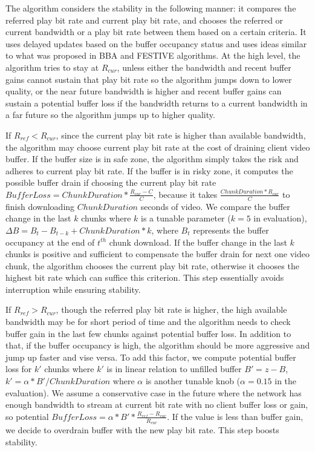 The algorithm considers the stability in the following manner: it
compares the referred play bit rate and current play bit rate, and
chooses the referred or current bandwidth or a play bit rate
between them based on a certain criteria. It uses delayed updates
based on the buffer occupancy status and uses ideas similar to what
was proposed in BBA \cite{BBA} and FESTIVE \cite{Festive} algorithms. 
At the high level, the algorithm tries to stay at $R_{cur}$, 
unless either the bandwidth and recent buffer gains cannot sustain 
that play bit rate so the algorithm jumps down to lower quality, 
or the near future bandwidth is higher and recent buffer gains can sustain a 
potential buffer loss if the bandwidth returns to a current bandwidth in a far future so the algorithm jumps up to higher quality.

If $R_{ref} < R_{cur}$, since the current play bit rate is higher than available bandwidth, the
algorithm may choose current play bit rate at the cost of draining
client video buffer. If the buffer size is in safe zone, the
algorithm simply takes the risk and adheres to current play bit rate. If the
buffer is in risky zone, it computes the possible buffer drain if
choosing the current play bit rate $BufferLoss
=ChunkDuration*\frac{R_{cur}-C}{C}$, because it takes $\frac{ChunkDuration*R_{cur}}{C}$ to finish downloading 
$ChunkDuration$ seconds of video. 
We compare the buffer change in
the last $k$ chunks where $k$ is a tunable parameter ($k=5$ in evaluation), 
$\Delta B = B_{t} -B_{t-k} + ChunkDuration*k$, where $B_{t}$
represents the buffer occupancy at the end of $t^{th}$ chunk
download. If the buffer change in the last $k$ chunks is positive and
sufficient to compensate the buffer drain for next one video chunk, the
algorithm chooses the current play bit rate, otherwise it chooses the
highest bit rate which can suffice this criterion. This step
essentially avoids interruption while ensuring stability. 


If $R_{ref} >R_{cur} $, though the referred play bit rate is higher,
the high available bandwidth may be for short period of time and the
algorithm needs to check buffer gain in the last few chunks against
potential buffer loss. In addition to that, if the buffer occupancy is
high, the algorithm should be more aggressive and jump up faster and
vise versa. To add this factor, we compute potential buffer loss for
$k'$ chunks where $k'$ is in linear relation to unfilled buffer
$B'=z-B$, $k'=\alpha * B'/ChunkDuration$ where $\alpha$ is another tunable knob ($\alpha=0.15$ in the evaluation). 
We assume a conservative case in the
future where the network has enough bandwidth to stream at current bit
rate with no client buffer loss or gain, so potential $BufferLoss=\alpha *
B' *\frac{R_{ref}-R_{cur}}{R_{cur}} $. If the value is less than buffer
gain, we decide to overdrain buffer with the new play bit rate. This
step boosts stability.



